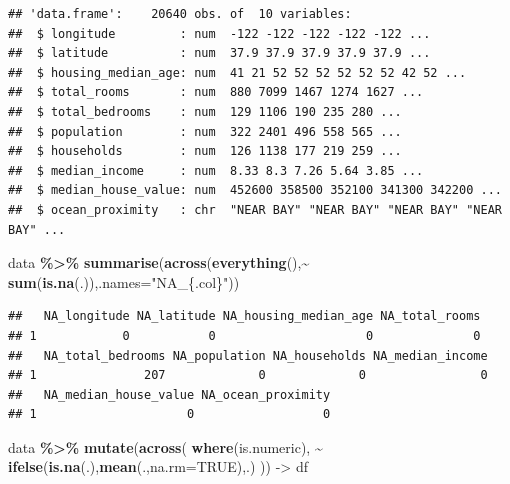 \documentclass[
]{book}
\newenvironment{Shaded}{\begin{snugshade}}{\end{snugshade}}
\newcommand{\AttributeTok}[1]{\textcolor[rgb]{0.13,0.29,0.53}{#1}}
\newcommand{\ConstantTok}[1]{\textcolor[rgb]{0.56,0.35,0.01}{#1}}
\newcommand{\FunctionTok}[1]{\textcolor[rgb]{0.13,0.29,0.53}{\textbf{#1}}}
\newcommand{\NormalTok}[1]{#1}
\newcommand{\OtherTok}[1]{\textcolor[rgb]{0.56,0.35,0.01}{#1}}
\newcommand{\SpecialCharTok}[1]{\textcolor[rgb]{0.81,0.36,0.00}{\textbf{#1}}}
\newcommand{\StringTok}[1]{\textcolor[rgb]{0.31,0.60,0.02}{#1}}
\begin{document}
\begin{verbatim}
## 'data.frame':    20640 obs. of  10 variables:
##  $ longitude         : num  -122 -122 -122 -122 -122 ...
##  $ latitude          : num  37.9 37.9 37.9 37.9 37.9 ...
##  $ housing_median_age: num  41 21 52 52 52 52 52 52 42 52 ...
##  $ total_rooms       : num  880 7099 1467 1274 1627 ...
##  $ total_bedrooms    : num  129 1106 190 235 280 ...
##  $ population        : num  322 2401 496 558 565 ...
##  $ households        : num  126 1138 177 219 259 ...
##  $ median_income     : num  8.33 8.3 7.26 5.64 3.85 ...
##  $ median_house_value: num  452600 358500 352100 341300 342200 ...
##  $ ocean_proximity   : chr  "NEAR BAY" "NEAR BAY" "NEAR BAY" "NEAR BAY" ...
\end{verbatim}

\begin{Shaded}
\begin{Highlighting}[]
\NormalTok{data }\SpecialCharTok{\%\textgreater{}\%} 
   \FunctionTok{summarise}\NormalTok{(}\FunctionTok{across}\NormalTok{(}\FunctionTok{everything}\NormalTok{(),}\SpecialCharTok{\textasciitilde{}} \FunctionTok{sum}\NormalTok{(}\FunctionTok{is.na}\NormalTok{(.)),}\AttributeTok{.names=}\StringTok{"NA\_\{.col\}"}\NormalTok{))}
\end{Highlighting}
\end{Shaded}

\begin{verbatim}
##   NA_longitude NA_latitude NA_housing_median_age NA_total_rooms
## 1            0           0                     0              0
##   NA_total_bedrooms NA_population NA_households NA_median_income
## 1               207             0             0                0
##   NA_median_house_value NA_ocean_proximity
## 1                     0                  0
\end{verbatim}

\begin{Shaded}
\begin{Highlighting}[]
\NormalTok{data }\SpecialCharTok{\%\textgreater{}\%} 
  \FunctionTok{mutate}\NormalTok{(}\FunctionTok{across}\NormalTok{(}
    \FunctionTok{where}\NormalTok{(is.numeric),}
    \SpecialCharTok{\textasciitilde{}} \FunctionTok{ifelse}\NormalTok{(}\FunctionTok{is.na}\NormalTok{(.),}\FunctionTok{mean}\NormalTok{(.,}\AttributeTok{na.rm=}\ConstantTok{TRUE}\NormalTok{),.)}
\NormalTok{  )) }\OtherTok{{-}\textgreater{}}\NormalTok{ df}
\end{Highlighting}
\end{Shaded}
\end{document}
